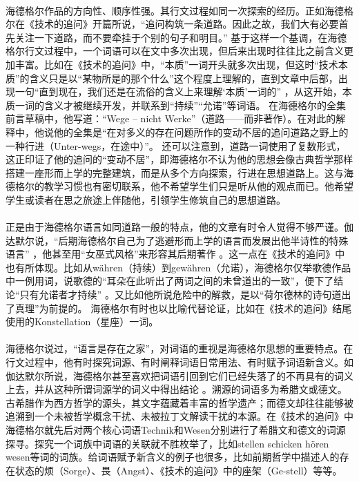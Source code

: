\documentclass{article}
\begin{document}
		\paragraph{}
		海德格尔作品的方向性、顺序性强。其行文过程如同一次探索的经历。正如海德格尔在《技术的追问》开篇所说，“追问构筑一条道路。因此之故，我们大有必要首先关注一下道路，而不要牵挂于个别的句子和明目。”
\cite{slct_Hei_Szx}
基于这样一个基调，在海德格尔行文过程中，一个词语可以在文中多次出现，但后来出现时往往比之前含义更加丰富。比如在《技术的追问》中，“本质”一词开头就多次出现，但这时“技术本质”的含义只是以“某物所是的那个什么”这个程度上理解的，直到文章中后部，出现一句“直到现在，我们还是在流俗的含义上来理解‘本质’一词的”
\cite{slct_Hei_Szx}
，从这开始，本质一词的含义才被继续开发，并联系到“持续”“允诺”等词语。
在海德格尔的全集前言草稿中，他写道：“Wege – nicht Werke”（道路——而非著作）。在对此的解释中，他说他的全集是“在对多义的存在问题所作的变动不居的追问道路之野上的一种行进（Unter-wegs，在途中）”。
\cite{sprach_sein_Szx}
还可以注意到，道路一词使用了复数形式，这正印证了他的追问的“变动不居”，即海德格尔不认为他的思想会像古典哲学那样搭建一座形而上学的完整建筑，而是从多个方向探索，行进在思想道路上。这与海德格尔的教学习惯也有密切联系，他不希望学生们只是听从他的观点而已。他希望学生或读者在思之旅途上伴随他，引领学生修筑自己的思想道路。
		\paragraph{}
		正是由于海德格尔语言如同道路一般的特点，他的文章有时令人觉得不够严谨。伽达默尔说，“后期海德格尔自己为了逃避形而上学的语言而发展出他半诗性的特殊语言”
\cite{Text_Explain_DeFr}
，他甚至用“女巫式风格”来形容其后期著作
\cite[pg. 113]{Deonstr_DeFr}
。这一点在《技术的追问》中也有所体现。比如从währen（持续）到gewähren（允诺），海德格尔仅举歌德作品中一例用词，说歌德的“耳朵在此听出了两词之间的未曾道出的一致”，便下了结论“只有允诺者才持续”
。又比如他所说危险中的解救，是以“荷尔德林的诗句道出了真理”为前提的\cite{slct_Hei_Szx}。
海德格尔有时也以比喻代替论证，比如在《技术的追问》结尾使用的Konstellation（星座）一词。
		\paragraph{}
		海德格尔说过，“语言是存在之家”，对词语的重视是海德格尔思想的重要特点。在行文过程中，他有时探究词源、有时阐释词语日常用法、有时赋予词语新含义。如伽达默尔所说，海德格尔甚至喜欢把词语引回到它们已经失落了的不再具有的词义上去，并从这种所谓词源学的词义中得出结论
\cite{Deonstr_DeFr}。溯源的词语多为希腊文或德文。古希腊作为西方哲学的源头，其文字蕴藏着丰富的哲学遗产；而德文却往往能够被追溯到一个未被哲学概念干扰、未被拉丁文解读干扰的本源。在《技术的追问》中海德格尔就先后对两个核心词语Technik和Wesen分别进行了希腊文和德文的词源探寻。探究一个词族中词语的关联就不胜枚举了，比如stellen schicken hören wesen等词的词族。给词语赋予新含义的例子也很多，比如前期哲学中描述人的存在状态的烦（Sorge）、畏（Angst）、《技术的追问》中的座架（Ge-stell）等等。
\end{document}
